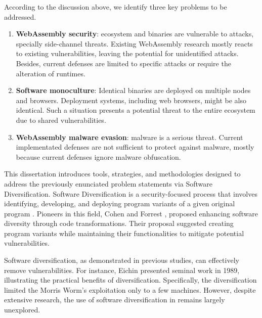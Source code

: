 
According to the discussion above, we identify three key problems to be addressed.

\begin{enumerate}[label=\textbf{Ps\arabic*}, ref=C\arabic*]

	\item \label{prob4} \textbf{WebAssembly security}: \Wasm ecosystem and binaries are vulnerable to attacks, specially side-channel threats. Existing WebAssembly research mostly reacts to existing vulnerabilities, leaving the potential for unidentified attacks.
	Besides, current defenses are limited to specific attacks or require the alteration of runtimes. 
	
	\item \label{prob2} \textbf{Software monoculture}: 
	Identical \Wasm binaries are deployed on multiple nodes and browsers. 
	Deployment systems, including web browsers, might be also identical. 
	Such a situation presents a potential threat to the entire ecosystem due to shared vulnerabilities.
	 
	\item \label{prob5} \textbf{WebAssembly malware evasion}: \Wasm malware is a serious threat. Current implementated defenses are not sufficient to protect against \Wasm malware, mostly because current defenses ignore malware obfuscation.

\end{enumerate}


\begin{comment}
\msection{Problem statement}

\end{comment}


This dissertation introduces tools, strategies, and methodologies designed to address the previously enunciated problem statements via Software Diversification.
Software Diversification is a security-focused process that involves identifying, developing, and deploying program variants of a given original program \cite{okhravi2013survey}.
Pioneers in this field, Cohen \etal \cite{cohen1993operating} and Forrest \etal \cite{595185}, proposed enhancing software diversity through code transformations. 
Their proposal suggested creating program variants while maintaining their functionalities to mitigate potential vulnerabilities.

Software diversification, as demonstrated in previous studies, can effectively remove vulnerabilities. 
For instance, Eichin \etal \cite{36307} presented seminal work in 1989, illustrating the practical benefits of diversification. 
Specifically, the diversification limited the Morris Worm's exploitation only to a few machines. 
However, despite extensive research, the use of software diversification in \Wasm remains largely unexplored. 


